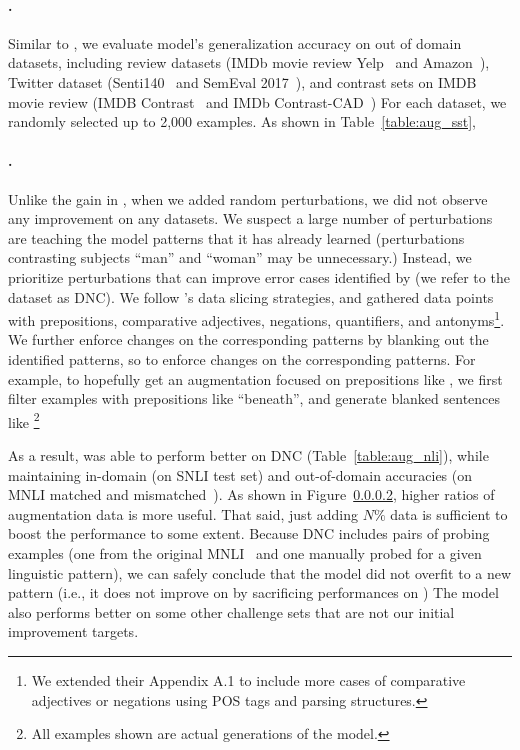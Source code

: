 \paragraph{\sst.}
 Similar to \citet{kaushik2019learning}, we evaluate \sst model's generalization accuracy on out of domain datasets, including review datasets (IMDb movie review Yelp~\cite{} and Amazon~\cite{}), Twitter dataset (Senti140~\cite{} and SemEval 2017~\cite{}), and contrast sets on IMDB movie review (IMDB Contrast~\cite{} and IMDb Contrast-CAD~\cite{})  
For each dataset, we randomly selected up to 2,000 examples.
As shown in Table~\ref{table:aug_sst}, 

\paragraph{\nli.}
Unlike the gain in \sst, when we added random perturbations, we did not observe any improvement on any datasets.
We suspect a large number of perturbations are teaching the model patterns that it has already learned (\eg perturbations contrasting subjects ``man'' and ``woman'' may be unnecessary.) 
Instead, we prioritize perturbations that can improve error cases identified by \citet{kim2019probing} (we refer to the dataset as DNC).
We follow \citet{chen2019slice}'s data slicing strategies, and gathered data points with prepositions, comparative adjectives, negations, quantifiers, and antonyms\footnote{We extended their Appendix A.1 to include more cases of \eg comparative adjectives or negations using POS tags and parsing structures.}.
We further enforce changes on the corresponding patterns by blanking out the identified patterns, so to enforce changes on the corresponding patterns.
For example, to hopefully get an augmentation focused on prepositions like , we first filter examples with prepositions like ``beneath'', and generate blanked sentences like 
\footnote{All examples shown are actual generations of the model. }

As a result, \maug was able to perform better on DNC (Table~\ref{table:aug_nli}), while maintaining in-domain (on SNLI test set) and out-of-domain accuracies (on MNLI matched and mismatched~\cite{}).
As shown in Figure~\ref{}, higher ratios of augmentation data is more useful. 
That said, just adding $N\%$ data is sufficient to boost the performance to some extent.
Because DNC includes pairs of probing examples (one from the original MNLI~\cite{} and one manually probed for a given linguistic pattern), we can safely conclude that the model did not overfit to a new pattern (i.e., it does not improve on  by sacrificing performances on )
The model also performs better on some other challenge sets that are not our initial improvement targets.


